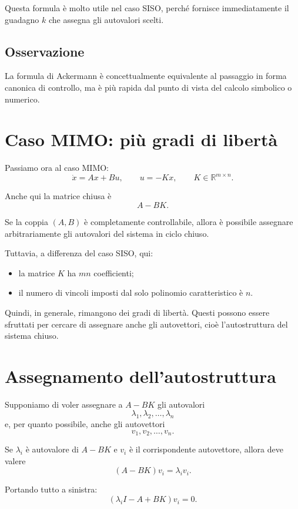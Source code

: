 Questa formula è molto utile nel caso SISO, perché fornisce immediatamente il guadagno \(k\)
che assegna gli autovalori scelti.

\subsection*{Osservazione}

La formula di Ackermann è concettualmente equivalente al passaggio in forma canonica di controllo,
ma è più rapida dal punto di vista del calcolo simbolico o numerico.

\section{Caso MIMO: più gradi di libertà}

Passiamo ora al caso MIMO:
\[
\dot x=Ax+Bu,
\qquad
u=-Kx,
\qquad
K\in\mathbb{R}^{m\times n}.
\]

Anche qui la matrice chiusa è
\[
A-BK.
\]

Se la coppia \((A,B)\) è completamente controllabile,
allora è possibile assegnare arbitrariamente gli autovalori del sistema in ciclo chiuso.

Tuttavia, a differenza del caso SISO, qui:
\begin{itemize}
    \item la matrice \(K\) ha \(mn\) coefficienti;
    \item il numero di vincoli imposti dal solo polinomio caratteristico è \(n\).
\end{itemize}

Quindi, in generale, rimangono dei gradi di libertà.
Questi possono essere sfruttati per cercare di assegnare anche gli autovettori,
cioè l'autostruttura del sistema chiuso.

\section{Assegnamento dell'autostruttura}

Supponiamo di voler assegnare a \(A-BK\) gli autovalori
\[
\lambda_1,\lambda_2,\dots,\lambda_n
\]
e, per quanto possibile, anche gli autovettori
\[
v_1,v_2,\dots,v_n.
\]

Se \(\lambda_i\) è autovalore di \(A-BK\) e \(v_i\) è il corrispondente autovettore,
allora deve valere
\[
(A-BK)v_i=\lambda_i v_i.
\]

Portando tutto a sinistra:
\[
(\lambda_i I-A+B K)v_i=0.
\]

